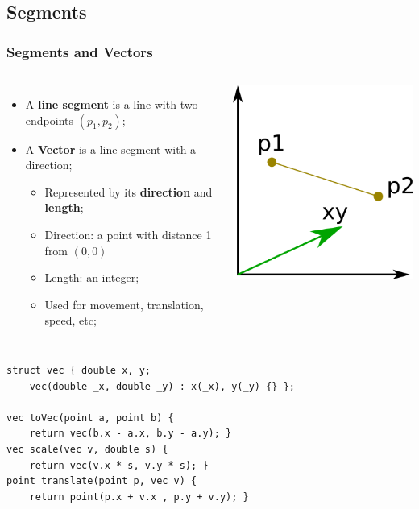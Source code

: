 \subsection{Segments}
\begin{frame}[fragile]
  \frametitle{Segments and Vectors}
    \begin{columns}
      \begin{itemize}
        \item A {\bf line segment} is a line with two endpoints $(p_1, p_2)$;
        \item A {\bf Vector} is a line segment with a direction;
        \begin{itemize}
          \item Represented by its {\bf direction} and {\bf length};
          \item Direction: a point with distance 1 from $(0,0)$
          \item Length: an integer;
          \item Used for movement, translation, speed, etc;
        \end{itemize}
      \end{itemize}
      \includegraphics[width=.9\textwidth]{../img/geom4}
    \end{columns}

{\smaller
    \begin{exampleblock}{}
\begin{verbatim}
struct vec { double x, y;
    vec(double _x, double _y) : x(_x), y(_y) {} };

vec toVec(point a, point b) {
    return vec(b.x - a.x, b.y - a.y); }
vec scale(vec v, double s) {
    return vec(v.x * s, v.y * s); }
point translate(point p, vec v) {
    return point(p.x + v.x , p.y + v.y); }
\end{verbatim}
    \end{exampleblock}
  }
\end{frame}

